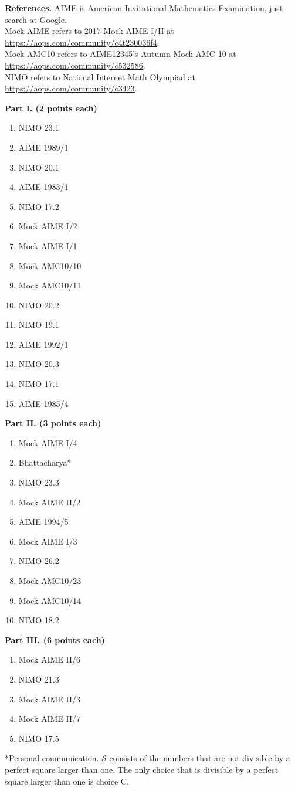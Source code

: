 \documentclass[10pt,paper=letter]{scrartcl}
\begin{document}
\noindent
\textbf{References.} AIME is American Invitational Mathematics Examination, just search at Google.\\Mock AIME refers to 2017 Mock AIME I/II at \url{https://aops.com/community/c4t230036f4}.\\Mock AMC10 refers to AIME12345's Autumn Mock AMC 10 at \url{https://aops.com/community/c532586}.\\NIMO refers to National Internet Math Olympiad at \url{https://aops.com/community/c3423}.

\begin{multicols}{3}
  \textbf{Part I. (2 points each)}
  \begin{enumerate}
    \item NIMO 23.1
    \item AIME 1989/1
    \item NIMO 20.1
    \item AIME 1983/1
    \item NIMO 17.2
    \item Mock AIME I/2
    \item Mock AIME I/1
    \item Mock AMC10/10
    \item Mock AMC10/11
    \item NIMO 20.2
    \item NIMO 19.1
    \item AIME 1992/1
    \item NIMO 20.3
    \item NIMO 17.1
    \item AIME 1985/4
  \end{enumerate}
  \textbf{Part II. (3 points each)}
  \begin{enumerate}
    \item Mock AIME I/4
    \item Bhattacharya*
    \item NIMO 23.3
    \item Mock AIME II/2
    \item AIME 1994/5
    \item Mock AIME I/3
    \item NIMO 26.2
    \item Mock AMC10/23
    \item Mock AMC10/14
    \item NIMO 18.2
  \end{enumerate}
  \textbf{Part III. (6 points each)}
  \begin{enumerate}
    \item Mock AIME II/6
    \item NIMO 21.3
    \item Mock AIME II/3
    \item Mock AIME II/7
    \item NIMO 17.5
  \end{enumerate}
\end{multicols}

*Personal communication. $\mathcal S$ consists of the numbers that are not divisible by a perfect square larger than one. The only choice that is divisible by a perfect square larger than one is choice C.
\end{document}
